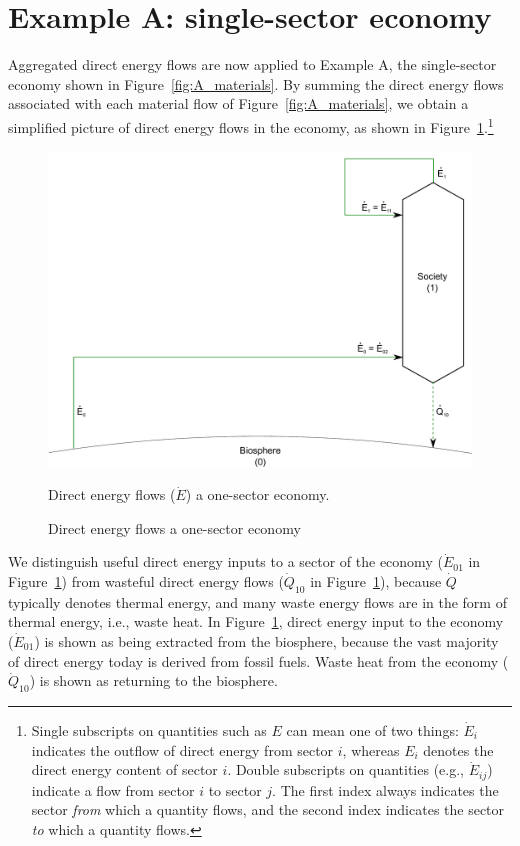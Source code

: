 \section{Example A: single-sector economy}
\label{sec:A_energy}

Aggregated direct energy flows are now applied to Example A, 
the single-sector economy shown in Figure~\ref{fig:A_materials}.
By summing the direct energy flows associated with
each material flow of Figure~\ref{fig:A_materials}, we obtain
a simplified picture of direct energy flows in the economy,
as shown in Figure~\ref{fig:A_energy}.\footnote{Single 
subscripts on quantities such as
$E$ can mean one of two things: 
$\dot{E}_{i}$ indicates the outflow of direct energy from sector $i$, 
whereas $E_{i}$ denotes the direct energy content of sector $i$. 
Double subscripts on quantities
(e.g., $\dot{E}_{ij}$) indicate a flow 
from sector $i$ to sector $j$. 
The first index always indicates the sector \emph{from} which a quantity flows, 
and the second index indicates the sector \emph{to} which a quantity flows.}

\begin{figure}[!ht]
\centering
\includegraphics[width=0.8\linewidth]{Part_2/Chapter_Energy/images/1_sector_direct_energy.pdf}
\caption{Direct energy flows a one-sector economy}{Direct energy flows ($\dot{E}$) a one-sector economy.}
\label{fig:A_energy}
\end{figure}

We distinguish useful direct energy inputs to a sector of the economy
($\dot{E}_{01}$ in Figure~\ref{fig:A_energy}) from wasteful direct energy flows 
($\dot{Q}_{10}$ in Figure~\ref{fig:A_energy}), 
because $\dot{Q}$ typically denotes thermal energy, 
and many waste energy flows are in the form of thermal
energy, i.e., waste heat. In Figure~\ref{fig:A_energy}, direct energy input to the 
economy ($\dot{E}_{01}$) is shown as being extracted from the biosphere, because
the vast majority of direct energy today is derived from fossil fuels.
Waste heat from the economy ($\dot{Q}_{10}$) is shown as returning 
to the biosphere.

